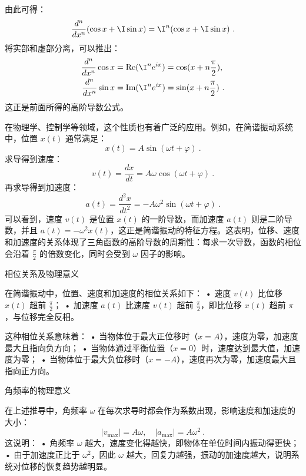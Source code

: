 由此可得：
\begin{equation}
\frac{d^n}{dx^n} (\cos x + \I \sin x) = \I^n (\cos x + \I \sin x)~.
\end{equation}
将实部和虚部分离，可以推出：
\begin{align*}
\frac{d^n}{dx^n} \cos x &= \text{Re} (\I^n e^{ix}) = \cos(x + n\frac{\pi}{2}), \\
\frac{d^n}{dx^n} \sin x &= \text{Im} (\I^n e^{ix}) = \sin(x + n\frac{\pi}{2})~.
\end{align*}
这正是前面所得的高阶导数公式。

在物理学、控制学等领域，这个性质也有着广泛的应用。例如，在简谐振动系统中，位置 $x(t)$ 通常满足：
\begin{equation}
x(t) = A \sin(\omega t + \varphi)~.
\end{equation}
求导得到速度：
\begin{equation}
v(t) = \frac{dx}{dt} = A\omega \cos(\omega t + \varphi)~.
\end{equation}
再求导得到加速度：
\begin{equation}
a(t) = \frac{d^2x}{dt^2} = -A\omega^2 \sin(\omega t + \varphi)~.
\end{equation}
可以看到，速度 $v(t)$ 是位置 $x(t)$ 的一阶导数，而加速度 $a(t)$ 则是二阶导数，并且 $a(t) = -\omega^2 x(t)$，这正是简谐振动的特征方程。这表明，位移、速度和加速度的关系体现了三角函数的高阶导数的周期性：每求一次导数，函数的相位会沿着 $\frac{\pi}{2}$ 的倍数变化，同时会受到 $\omega$ 因子的影响。

相位关系及物理意义

在简谐振动中，位置、速度和加速度的相位关系如下：
	•	速度 $v(t)$ 比位移 $x(t)$ 超前 $\frac{\pi}{2}$；
	•	加速度 $a(t)$ 比速度 $v(t)$ 超前 $\frac{\pi}{2}$，即比位移 $x(t)$ 超前 $\pi$，与位移完全反相。

这种相位关系意味着：
	•	当物体位于最大正位移时（$x = A$），速度为零，加速度最大且指向负方向；
	•	当物体通过平衡位置（$x = 0$）时，速度达到最大值，加速度为零；
	•	当物体位于最大负位移时（$x = -A$），速度再次为零，加速度最大且指向正方向。

角频率的物理意义

在上述推导中，角频率 $\omega$ 在每次求导时都会作为系数出现，影响速度和加速度的大小：
\begin{equation}
|v_{\max}| = A\omega, \quad |a_{\max}| = A\omega^2~.
\end{equation}
这说明：
	•	角频率 $\omega$ 越大，速度变化得越快，即物体在单位时间内振动得更快；
	•	由于加速度正比于 $\omega^2$，因此 $\omega$ 越大，回复力越强，振动的加速度越大，说明系统对位移的恢复趋势越明显。

